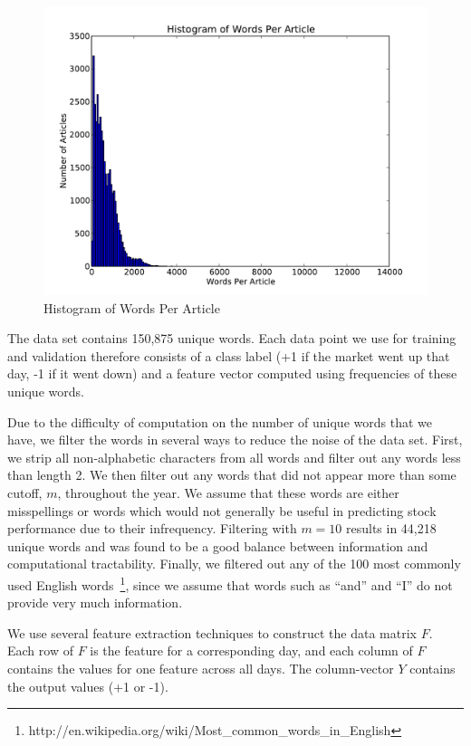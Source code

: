 \documentclass[10pt, twocolumn]{article}
\begin{document}
\begin{figure}
\centering
\includegraphics[scale=0.3]{text/wordshist.pdf}
\caption{Histogram of Words Per Article}
\label{wordshist}
\end{figure}

The data set contains 150,875 unique words. Each data point we use for training and validation therefore consists of a class label (+1 if the market went up that day, -1 if it went down) and a feature vector computed using frequencies of these unique words.

Due to the difficulty of computation on the number of unique words that we have, we filter the words in several ways to reduce the noise of the data set. First, we strip all non-alphabetic characters from all words and filter out any words less than length 2. We then filter out any words that did not appear more than some cutoff, $m$, throughout the year. We assume that these words are either misspellings or words which would not generally be useful in predicting stock performance due to their infrequency. Filtering with $m = 10$ results in 44,218 unique words and was found to be a good balance between information and computational tractability.
Finally, we filtered out any of the 100 most commonly used English words~\footnote{http://en.wikipedia.org/wiki/Most\_common\_words\_in\_English}, since we
assume that words such as ``and'' and ``I'' do not provide very much information.

We use several feature extraction techniques to construct the data matrix $F$. Each row of $F$ is the feature for a corresponding day, and each column of $F$
contains the values for one feature across all days. The column-vector $Y$ contains the output values (+1 or -1). 
\end{document}
